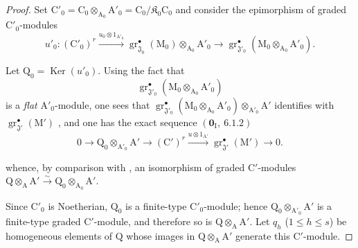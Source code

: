 \begin{proof}
Set $\mathrm{C}'_0=\mathrm{C}_0\otimes_{\mathrm{A}_0}\mathrm{A}'_0
=\mathrm{C}_0/\mathfrak K_0\mathrm{C}_0$
and consider the epimorphism of graded $\mathrm{C}'_0$-modules
\[
  u'_0:(\mathrm{C}'_0)^r
  \xrightarrow{u_0\otimes 1_{\mathrm{A}'_0}}
  \operatorname{gr}^\bullet_{\mathfrak{J}_0}(\mathrm{M}_0)\otimes_{\mathrm{A}_0}\mathrm{A}'_0
  \longrightarrow
  \operatorname{gr}^\bullet_{\mathfrak{J}'_0}
  (\mathrm{M}_0\otimes_{\mathrm{A}_0}\mathrm{A}'_0).
\]

Let $\mathrm{Q}_0=\operatorname{Ker}(u'_0)$. Using the fact that
\[
  \operatorname{gr}^\bullet_{\mathfrak{J}'_0}
  (\mathrm{M}_0\otimes_{\mathrm{A}_0}\mathrm{A}'_0)
\]
is a \emph{flat} $\mathrm{A}'_0$-module, one sees that $\operatorname{gr}^\bullet_{\mathfrak{J}'_0}(\mathrm{M}_0\otimes_{\mathrm{A}_0}\mathrm{A}'_0)\otimes_{\mathrm{A}'_0}\mathrm{A}'$ identifies with $\operatorname{gr}^\bullet_{\mathfrak{J}'}(\mathrm{M}')$ , and one has the exact sequence $(\mathbf{0}_\mathrm{I},~6.1.2)$
\begin{equation}
  0\longrightarrow\mathrm{Q}_0\otimes_{\mathrm{A}'_0}\mathrm{A}'
  \longrightarrow(\mathrm{C}')^r
  \xrightarrow{u\otimes 1_{\mathrm{A}'}}
  \operatorname{gr}^\bullet_{\mathfrak{J}'}(\mathrm{M}')
  \longrightarrow 0.
  \label{IV.11.2.9.8}
\tag{11.2.9.8}
\end{equation}


whence, by comparison with , an isomorphism of graded $\mathrm{C}'$-modules $\mathrm{Q}\otimes_\mathrm{A}\mathrm{A}'
\xrightarrow{\sim}
\mathrm{Q}_0\otimes_{\mathrm{A}_0}\mathrm{A}'$.

Since $\mathrm{C}'_0$ is Noetherian, $\mathrm{Q}_0$ is a finite-type $\mathrm{C}'_0$-module; hence $\mathrm{Q}_0\otimes_{\mathrm{A}'_0}\mathrm{A}'$ is a finite-type graded $\mathrm{C}'$-module, and therefore so is $\mathrm{Q}\otimes_\mathrm{A}\mathrm{A}'$. Let $q_h$ ($1\leqslant h\leqslant s$) be homogeneous elements of $\mathrm{Q}$ whose images in $\mathrm{Q}\otimes_\mathrm{A}\mathrm{A}'$ generate this $\mathrm{C}'$-module.


\end{proof}

